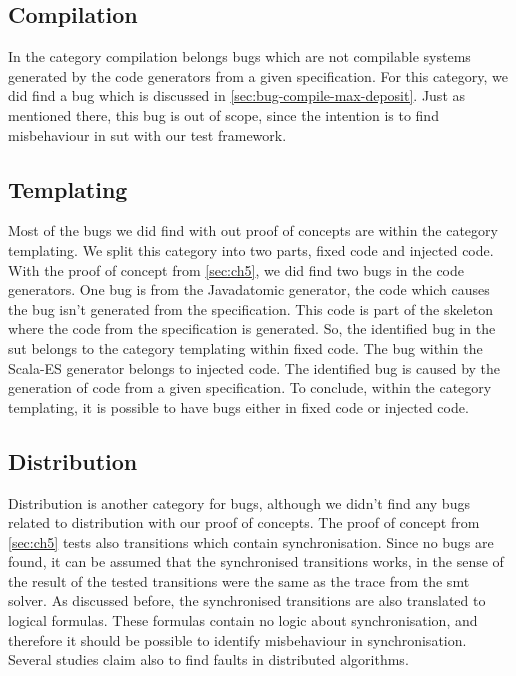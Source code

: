 \subsection{Compilation}
In the category compilation belongs bugs which are not compilable systems generated by the code generators from a given specification. For this category, we did find a bug which is discussed in \autoref{sec:bug-compile-max-deposit}. Just as mentioned there, this bug is out of scope, since the intention is to find misbehaviour in \gls{sut} with our test framework.

\subsection{Templating}
Most of the bugs we did find with out proof of concepts are within the category templating. We split this category into two parts, fixed code and injected code. With the proof of concept from \autoref{sec:ch5}, we did find two bugs in the code generators. One bug is from the Javadatomic generator, the code which causes the bug isn't generated from the specification. This code is part of the skeleton where the code from the specification is generated. So, the identified bug in the \gls{sut} belongs to the category templating within fixed code. The bug within the Scala-ES generator belongs to injected code. The identified bug is caused by the generation of code from a given specification. To conclude, within the category templating, it is possible to have bugs either in fixed code or injected code.

\subsection{Distribution}
Distribution is another category for bugs, although we didn't find any bugs related to distribution with our proof of concepts. The proof of concept from \autoref{sec:ch5} tests also transitions which contain synchronisation. Since no bugs are found, it can be assumed that the synchronised transitions works, in the sense of the result of the tested transitions were the same as the trace from the \gls{smt} solver. As discussed before, the synchronised transitions are also translated to logical formulas. These formulas contain no logic about synchronisation, and therefore it should be possible to identify misbehaviour in synchronisation. Several studies claim also to find faults in distributed algorithms.

